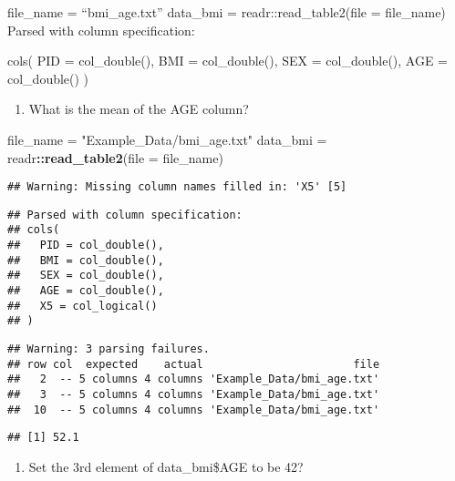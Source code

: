 \documentclass[]{article}
\newenvironment{Shaded}{\begin{snugshade}}{\end{snugshade}}
\newcommand{\DataTypeTok}[1]{\textcolor[rgb]{0.13,0.29,0.53}{#1}}
\newcommand{\KeywordTok}[1]{\textcolor[rgb]{0.13,0.29,0.53}{\textbf{#1}}}
\newcommand{\NormalTok}[1]{#1}
\newcommand{\OperatorTok}[1]{\textcolor[rgb]{0.81,0.36,0.00}{\textbf{#1}}}
\newcommand{\StringTok}[1]{\textcolor[rgb]{0.31,0.60,0.02}{#1}}
\providecommand{\tightlist}{%
  \setlength{\itemsep}{0pt}\setlength{\parskip}{0pt}}
\begin{document}
file\_name = ``bmi\_age.txt'' data\_bmi = readr::read\_table2(file =
file\_name) Parsed with column specification:

cols( PID = col\_double(), BMI = col\_double(), SEX = col\_double(), AGE
= col\_double() )

\begin{enumerate}
\def\labelenumi{\alph{enumi}.}
\tightlist
\item
  What is the mean of the AGE column?
\end{enumerate}

\begin{Shaded}
\begin{Highlighting}[]
\NormalTok{file_name =}\StringTok{ "Example_Data/bmi_age.txt"}
\NormalTok{data_bmi =}\StringTok{ }\NormalTok{readr}\OperatorTok{::}\KeywordTok{read_table2}\NormalTok{(}\DataTypeTok{file =}\NormalTok{ file_name)}
\end{Highlighting}
\end{Shaded}

\begin{verbatim}
## Warning: Missing column names filled in: 'X5' [5]
\end{verbatim}

\begin{verbatim}
## Parsed with column specification:
## cols(
##   PID = col_double(),
##   BMI = col_double(),
##   SEX = col_double(),
##   AGE = col_double(),
##   X5 = col_logical()
## )
\end{verbatim}

\begin{verbatim}
## Warning: 3 parsing failures.
## row col  expected    actual                       file
##   2  -- 5 columns 4 columns 'Example_Data/bmi_age.txt'
##   3  -- 5 columns 4 columns 'Example_Data/bmi_age.txt'
##  10  -- 5 columns 4 columns 'Example_Data/bmi_age.txt'
\end{verbatim}

\begin{Shaded}
\end{Shaded}

\begin{verbatim}
## [1] 52.1
\end{verbatim}

\begin{enumerate}
\def\labelenumi{\alph{enumi}.}
\setcounter{enumi}{1}
\tightlist
\item
  Set the 3rd element of data\_bmi\$AGE to be 42?
\end{enumerate}
\end{document}

